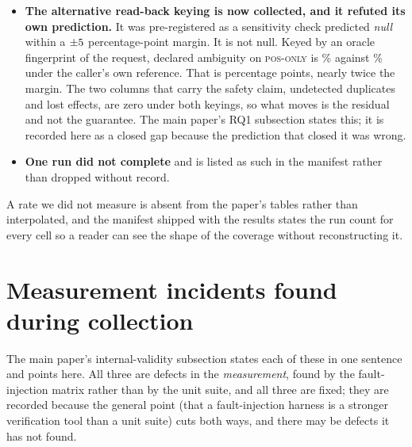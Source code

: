 \documentclass[10pt,journal,compsoc]{IEEEtran}
\begin{document}
\begin{itemize}
\item \textbf{The alternative read-back keying is now collected, and it
      refuted its own prediction.} It was pre-registered as a sensitivity
      check predicted \emph{null} within a $\pm5{}$
      percentage-point margin. It is not null. Keyed by an oracle
      fingerprint of the request, declared ambiguity on \textsc{pos-only} is
      \KeyingAmbiguityOracle{}\% against \KeyingAmbiguityCaller{}\% under the
      caller's own reference. That is \KeyingAmbiguityDelta{} percentage
      points, nearly twice the margin. The two columns that carry the safety
      claim, undetected duplicates and lost effects, are zero under both
      keyings, so what moves is the residual and not the guarantee. The main
      paper's RQ1 subsection states this; it is recorded here as a closed gap
      because the prediction that closed it was wrong.

\item \textbf{One run did not complete} and is listed as such in the manifest
      rather than dropped without record.
\end{itemize}

A rate we did not measure is absent from the paper's tables rather than
interpolated, and the manifest shipped with the results states the run count for
every cell so a reader can see the shape of the coverage without reconstructing
it.

\section{Measurement incidents found during collection}
\label{supp:incidents}

The main paper's internal-validity subsection states each of these in one
sentence and points here. All three are defects in the \emph{measurement}, found
by the fault-injection matrix rather than by the unit suite, and all three are
fixed; they are recorded because the general point (that a fault-injection
harness is a stronger verification tool than a unit suite) cuts both ways,
and there may be defects it has not found.
\end{document}
